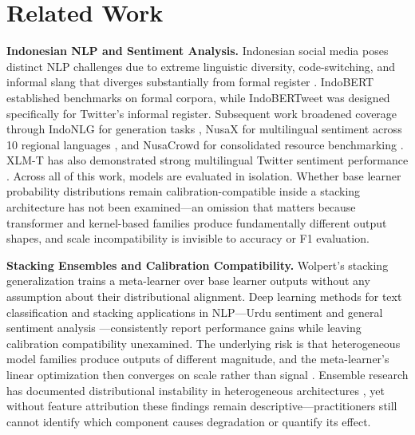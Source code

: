 \documentclass[conference]{IEEEtran}
\begin{document}
\section{Related Work}

\textbf{Indonesian NLP and Sentiment Analysis.}
Indonesian social media poses distinct NLP challenges due to extreme linguistic diversity, code-switching, and informal slang that diverges substantially from formal register \cite{b5}. IndoBERT \cite{b3} established benchmarks on formal corpora, while IndoBERTweet \cite{b4} was designed specifically for Twitter's informal register. Subsequent work broadened coverage through IndoNLG for generation tasks \cite{b2}, NusaX for multilingual sentiment across 10 regional languages \cite{b6}, and NusaCrowd for consolidated resource benchmarking \cite{b19}. XLM-T has also demonstrated strong multilingual Twitter sentiment performance \cite{b29}. Across all of this work, models are evaluated in isolation. Whether base learner probability distributions remain calibration-compatible inside a stacking architecture has not been examined---an omission that matters because transformer and kernel-based families produce fundamentally different output shapes, and scale incompatibility is invisible to accuracy or F1 evaluation.

\textbf{Stacking Ensembles and Calibration Compatibility.}
Wolpert's stacking generalization \cite{b7} trains a meta-learner over base learner outputs without any assumption about their distributional alignment. Deep learning methods for text classification \cite{b9} and stacking applications in NLP---Urdu sentiment \cite{b8} and general sentiment analysis \cite{b10}---consistently report performance gains while leaving calibration compatibility unexamined. The underlying risk is that heterogeneous model families produce outputs of different magnitude, and the meta-learner's linear optimization then converges on scale rather than signal \cite{b17}. Ensemble research has documented distributional instability in heterogeneous architectures \cite{b22}, yet without feature attribution these findings remain descriptive---practitioners still cannot identify which component causes degradation or quantify its effect.
\end{document}
